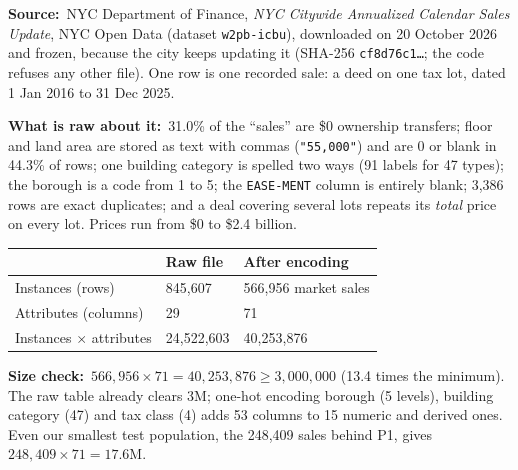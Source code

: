 \documentclass[10pt,a4paper,twocolumn]{article}
\newcommand{\code}[1]{\texttt{#1}}
\newcommand{\lab}[2]{\textbf{#1}~#2\par}
\begin{document}
\lab{Source:}{NYC Department of Finance, \emph{NYC Citywide Annualized Calendar Sales Update},
NYC Open Data (dataset \code{w2pb-icbu}), downloaded on 20 October 2026 and frozen, because the
city keeps updating it (SHA-256 \code{cf8d76c1\ldots}; the code refuses any other file). One row
is one recorded sale: a deed on one tax lot, dated 1 Jan 2016 to 31 Dec 2025.}

\lab{What is raw about it:}{31.0\% of the ``sales'' are \$0 ownership transfers; floor and land
area are stored as text with commas (\code{"55,000"}) and are 0 or blank in 44.3\% of rows; one
building category is spelled two ways (91 labels for 47 types); the borough is a code from 1 to 5;
the \code{EASE-MENT} column is entirely blank; 3,386 rows are exact duplicates; and a deal covering
several lots repeats its \emph{total} price on every lot. Prices run from \$0 to \$2.4 billion.}

{\small
\begin{tabularx}{\linewidth}{@{}L{3.0cm} Y Y@{}}
\toprule
 & \textbf{Raw file} & \textbf{After encoding} \\
\midrule
Instances (rows) & 845,607 & 566,956 market sales \\
Attributes (columns) & 29 & 71 \\
Instances $\times$ attributes & 24,522,603 & 40,253,876 \\
\bottomrule
\end{tabularx}}

\lab{Size check:}{$566{,}956\times71=40{,}253{,}876\ge3{,}000{,}000$ (13.4 times the minimum).
The raw table already clears 3M; one-hot encoding borough (5 levels), building category (47) and
tax class (4) adds 53 columns to 15 numeric and derived ones. Even our smallest test population,
the 248,409 sales behind P1, gives $248{,}409\times71=17.6$M.}
\end{document}
